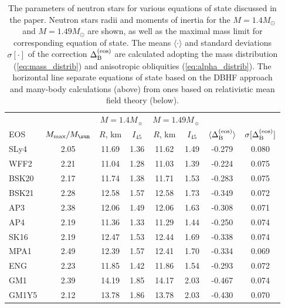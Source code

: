 \documentclass[fleqn,usenatbib]{mnras}
\begin{document}
\begin{table*}
\centering
\caption{The parameters of neutron stars for various equations of state discussed in the paper. Neutron stars radii and moments of inertia
for the $M=1.4M_{\odot}$ and $M=1.49M_{\odot}$ are shown, as well as the
maximal mass limit for corresponding equation of state. The means $\langle \cdot \rangle$ and standard deviations $\sigma[\cdot]$ of the
correction $\Delta_{\rm B}^{\rm (eos)}$ are calculated adopting the mass distribution (\ref{eq:mass_distrib}) and anisotropic
obliquities (\ref{eq:alpha_distrib}). The horizontal line separate equations of state based on the DBHF approach and many-body calculations (above) from ones based on relativistic mean field theory (below).}
\label{tab:NSC}
\begin{centering}
\begin{tabular}{lccccccc}
  \hline
       &                         & \multicolumn{2}{c}{$M = 1.4 M_{\sun}$} & \multicolumn{2}{c}{$M = 1.49 M_{\sun}$} \\
   EOS & $M_{\rm max}/M_{\sun}$  & $R$, km  & $I_{45}$                  & $R$, km & $I_{45}$ & $\langle \Delta_{\rm B}^{\rm (eos)}\rangle$ & $\sigma[\Delta_{\rm B}^{\rm (eos)}]$ \\
  \hline
  SLy4              & 2.05 & 11.69   & 1.36 & 11.62   & 1.49 & -0.279 &  0.080 \\
  WFF2              & 2.21 & 11.04   & 1.28 & 11.03   & 1.39 & -0.224 &  0.075 \\
  BSK20             & 2.17 & 11.74   & 1.38 & 11.71   & 1.53 & -0.283 &  0.075 \\
  BSK21             & 2.28 & 12.58   & 1.57 & 12.58   & 1.73 & -0.349 &  0.072 \\
  AP3               & 2.38 & 12.06   & 1.49 & 12.06   & 1.63 & -0.308 &  0.071 \\
  AP4               & 2.19 & 11.36   & 1.33 & 11.29   & 1.44 & -0.250 &  0.074 \\
  SK16              & 2.19 & 12.47   & 1.53 & 12.44   & 1.69 & -0.338 &  0.074 \\
  MPA1              & 2.49 & 12.39   & 1.57 & 12.41   & 1.70 & -0.334 &  0.069 \\
  ENG               & 2.23 & 11.85   & 1.42 & 11.86   & 1.54 & -0.293 &  0.072 \\
 \hline
  GM1               & 2.39 & 14.19   & 1.85 & 14.17   & 2.03 & -0.467 &  0.074 \\
  GM1Y5             & 2.12 & 13.78   & 1.86 & 13.78   & 2.03 & -0.430 &  0.070 \\

\end{tabular}
\end{centering}
\end{table*}
\end{document}
